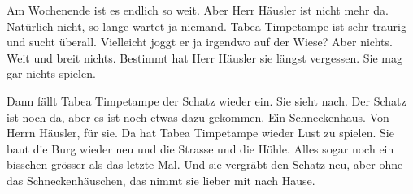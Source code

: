 Am Wochenende ist es endlich so weit. Aber Herr Häusler ist nicht mehr da. Natürlich nicht, so lange wartet ja niemand. Tabea Timpetampe ist sehr traurig und sucht überall. Vielleicht joggt er ja irgendwo auf der Wiese? Aber nichts. Weit und breit nichts. Bestimmt hat Herr Häusler sie längst vergessen. Sie mag gar nichts spielen.

Dann fällt Tabea Timpetampe der Schatz wieder ein. Sie sieht nach. Der Schatz ist noch da, aber es ist noch etwas dazu gekommen. Ein Schneckenhaus. Von Herrn Häusler, für sie. Da hat Tabea Timpetampe wieder Lust zu spielen. Sie baut die Burg wieder neu und die Strasse und die Höhle. Alles sogar noch ein bisschen grösser als das letzte Mal. Und sie vergräbt den Schatz neu, aber ohne das Schneckenhäuschen, das nimmt sie lieber mit nach Hause.



 \hfill {\color{red}\decofourleft}
